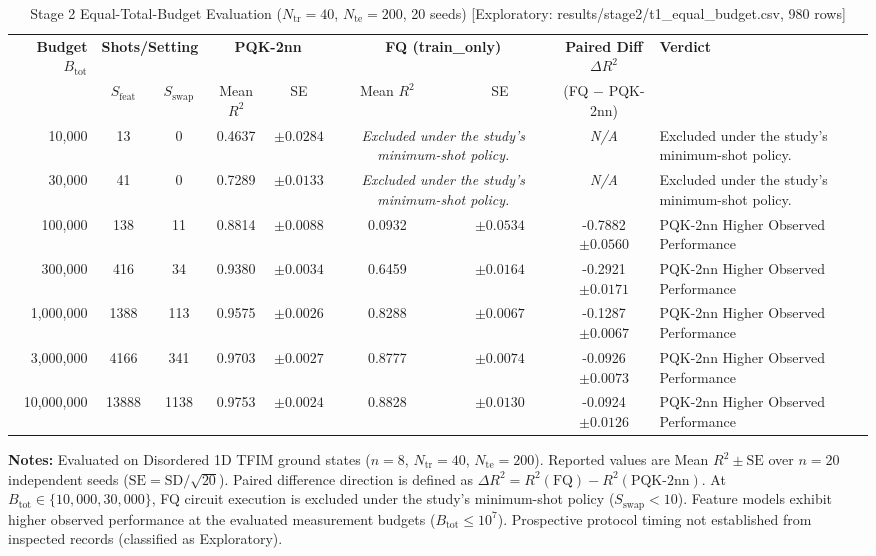 \begin{table}[!t]
\caption{Stage 2 Equal-Total-Budget Evaluation ($N_{\mathrm{tr}}=40$, $N_{\mathrm{te}}=200$, 20 seeds) [Exploratory: results/stage2/t1_equal_budget.csv, 980 rows]}
\label{tab:equal_budget}
\centering
\begingroup
\small
\setlength{\tabcolsep}{4.5pt}
\begin{tabular}{@{}rcccccccl@{}}
\toprule
\textbf{Budget} $B_{\mathrm{tot}}$ & \multicolumn{2}{c}{\textbf{Shots/Setting}} & \multicolumn{2}{c}{\textbf{PQK-2nn}} & \multicolumn{2}{c}{\textbf{FQ (train\_only)}} & \textbf{Paired Diff} $\Delta R^2$ & \textbf{Verdict} \\
\cmidrule(lr){2-3}\cmidrule(lr){4-5}\cmidrule(lr){6-7}\cmidrule(lr){8-8}
 & $S_{\mathrm{feat}}$ & $S_{\mathrm{swap}}$ & Mean $R^2$ & SE & Mean $R^2$ & SE & (FQ $-$ PQK-2nn) & \\
\midrule
10,000 & 13 & 0 & 0.4637 & $\pm 0.0284$ & \multicolumn{2}{c}{\textit{Excluded under the study's minimum-shot policy.}} & \textit{N/A} & Excluded under the study's minimum-shot policy. \\
30,000 & 41 & 0 & 0.7289 & $\pm 0.0133$ & \multicolumn{2}{c}{\textit{Excluded under the study's minimum-shot policy.}} & \textit{N/A} & Excluded under the study's minimum-shot policy. \\
100,000 & 138 & 11 & 0.8814 & $\pm 0.0088$ & 0.0932 & $\pm 0.0534$ & -0.7882 $\pm 0.0560$ & PQK-2nn Higher Observed Performance \\
300,000 & 416 & 34 & 0.9380 & $\pm 0.0034$ & 0.6459 & $\pm 0.0164$ & -0.2921 $\pm 0.0171$ & PQK-2nn Higher Observed Performance \\
1,000,000 & 1388 & 113 & 0.9575 & $\pm 0.0026$ & 0.8288 & $\pm 0.0067$ & -0.1287 $\pm 0.0067$ & PQK-2nn Higher Observed Performance \\
3,000,000 & 4166 & 341 & 0.9703 & $\pm 0.0027$ & 0.8777 & $\pm 0.0074$ & -0.0926 $\pm 0.0073$ & PQK-2nn Higher Observed Performance \\
10,000,000 & 13888 & 1138 & 0.9753 & $\pm 0.0024$ & 0.8828 & $\pm 0.0130$ & -0.0924 $\pm 0.0126$ & PQK-2nn Higher Observed Performance \\
\bottomrule
\end{tabular}
\endgroup
\vspace{1ex}
{\raggedright \footnotesize \textbf{Notes:} Evaluated on Disordered 1D TFIM ground states ($n=8$, $N_{\mathrm{tr}}=40$, $N_{\mathrm{te}}=200$). Reported values are Mean $R^2 \pm \text{SE}$ over $n=20$ independent seeds ($\mathrm{SE} = \mathrm{SD}/\sqrt{20}$). Paired difference direction is defined as $\Delta R^2 = R^2(\mathrm{FQ}) - R^2(\mathrm{PQK\text{-}2nn})$. At $B_{\mathrm{tot}} \in \{10{,}000, 30{,}000\}$, FQ circuit execution is excluded under the study's minimum-shot policy ($S_{\mathrm{swap}} < 10$). Feature models exhibit higher observed performance at the evaluated measurement budgets ($B_{\mathrm{tot}} \le 10^7$). Prospective protocol timing not established from inspected records (classified as Exploratory).\par}
\end{table}
